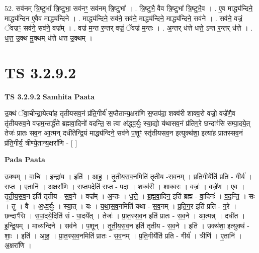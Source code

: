 \documentclass[17pt]{extarticle}
\begin{document}
52. सव॑नम् त्रि॒ष्टुभा᳚ त्रि॒ष्टुभा॒ सव॑नꣳ॒॒ सव॑नम् त्रि॒ष्टुभा᳚ । . त्रि॒ष्टुभै॒ वैव त्रि॒ष्टुभा᳚ त्रि॒ष्टुभै॒व । . ए॒व माद्ध्य॑न्दिने॒ माद्ध्य॑न्दिन ए॒वैव माद्ध्य॑न्दिने । . माद्ध्य॑न्दिने॒ सव॑ने॒ सव॑ने॒ माद्ध्य॑न्दिने॒ माद्ध्य॑न्दिने॒ सव॑ने । . सव॑ने॒ वज्रं॒ ॅवज्रꣳ॒॒ सव॑ने॒ सव॑ने॒ वज्र᳚म् । . वज्र॑ म॒न्त र॒न्तर् वज्रं॒ ॅवज्र॑ म॒न्तः । . अ॒न्तर् ध॑त्ते धत्ते॒ ऽन्त र॒न्तर् ध॑त्ते । . ध॒त्त॒ उ॒क्थ मु॒क्थम् ध॑त्ते धत्त उ॒क्थम् । \newline


\section{ TS 3.2.9.2 }

\textbf{TS 3.2.9.2 } \newline
\textbf{Samhita Paata} \newline

उ॒क्थं ॅवा॒चीन्द्रा॒येत्या॑ह तृतीयसव॒नं प्र॑ति॒गीर्य॑ स॒प्तैतान्य॒क्षरा॑णि स॒प्तप॑दा॒ शक्व॑री शाक्व॒रो वज्रो॒ वज्रे॑णै॒व तृ॑तीयसव॒ने वज्र॑म॒न्तर्द्ध॑त्ते ब्रह्मवा॒दिनो॑ वदन्ति॒ स त्वा अ॑द्ध्व॒र्युः स्या॒द्यो य॑थासव॒नं प्र॑तिग॒रे छन्दाꣳ॑सि सम्पा॒दये॒त् तेजः॑ प्रातः सव॒न आ॒त्मन् दधी॑तेन्द्रि॒यं माद्ध्य॑न्दिने॒ सव॑ने प॒शूꣳ स्तृ॑तीयसव॒न इत्युक्थ॑शा॒ इत्या॑ह प्रातस्सव॒नं प्र॑ति॒गीर्य॒ त्रीण्ये॒तान्य॒क्षरा॑णि - [  ] \newline

\textbf{Pada Paata} \newline

उ॒क्थम् । वा॒चि । इन्द्रा॑य । इति॑ । आ॒ह॒ । तृ॒ती॒य॒स॒व॒नमिति॑ तृतीय -स॒व॒नम् । प्र॒ति॒गीर्येति॑ प्रति - गीर्य॑ । स॒प्त । ए॒तानि॑ । अ॒क्षरा॑णि । स॒प्तप॒देति॑ स॒प्त - प॒दा॒ । शक्व॑री । शा॒क्व॒रः । वज्रः॑ । वज्रे॑ण । ए॒व । तृ॒ती॒य॒स॒व॒न इति॑ तृतीय - स॒व॒ने । वज्र᳚म् । अ॒न्तः । ध॒त्ते॒ । ब्र॒ह्म॒वा॒दिन॒ इति॑ ब्रह्म - वा॒दिनः॑ । व॒द॒न्ति॒ । सः । तु । वै । अ॒ध्व॒र्युः । स्या॒त् । यः । य॒था॒स॒व॒नमिति॑ यथा - स॒व॒नम् । प्र॒ति॒ग॒र इति॑ प्रति - ग॒रे । छन्दाꣳ॑सि । स॒पां॒दये॒दिति॑ सं - पा॒दये᳚त् । तेजः॑ । प्रा॒त॒स्स॒व॒न इति॑ प्रातः - स॒व॒ने । आ॒त्मन्न् । दधी॑त । इ॒न्द्रि॒यम् । माध्य॑न्दिने । सव॑ने । प॒शून् । तृ॒ती॒य॒स॒व॒न इति॑ तृतीय - स॒व॒ने । इति॑ । उक्थ॑शा॒ इत्युक्थ॑ - शाः॒ । इति॑ । आ॒ह॒ । प्रा॒त॒स्स॒व॒नमिति॑ प्रातः - स॒व॒नम् । प्र॒ति॒गीर्येति॑ प्रति - गीर्य॑ । त्रीणि॑ । ए॒तानि॑ । अ॒क्षरा॑णि ।  \newline
\end{document}
